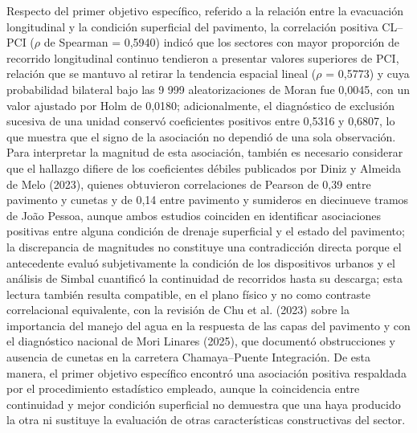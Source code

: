Respecto del primer objetivo específico, referido a la relación entre la evacuación longitudinal y la condición superficial del pavimento, la correlación positiva CL--PCI ($\rho$ de Spearman = 0,5940) indicó que los sectores con mayor proporción de recorrido longitudinal continuo tendieron a presentar valores superiores de PCI, relación que se mantuvo al retirar la tendencia espacial lineal ($\rho$ = 0,5773) y cuya probabilidad bilateral bajo las 9 999 aleatorizaciones de Moran fue 0,0045, con un valor ajustado por Holm de 0,0180; adicionalmente, el diagnóstico de exclusión sucesiva de una unidad conservó coeficientes positivos entre 0,5316 y 0,6807, lo que muestra que el signo de la asociación no dependió de una sola observación. Para interpretar la magnitud de esta asociación, también es necesario considerar que el hallazgo difiere de los coeficientes débiles publicados por Diniz y Almeida de Melo (2023), quienes obtuvieron correlaciones de Pearson de 0,39 entre pavimento y cunetas y de 0,14 entre pavimento y sumideros en diecinueve tramos de João Pessoa, aunque ambos estudios coinciden en identificar asociaciones positivas entre alguna condición de drenaje superficial y el estado del pavimento; la discrepancia de magnitudes no constituye una contradicción directa porque el antecedente evaluó subjetivamente la condición de los dispositivos urbanos y el análisis de Simbal cuantificó la continuidad de recorridos hasta su descarga; esta lectura también resulta compatible, en el plano físico y no como contraste correlacional equivalente, con la revisión de Chu et al. (2023) sobre la importancia del manejo del agua en la respuesta de las capas del pavimento y con el diagnóstico nacional de Mori Linares (2025), que documentó obstrucciones y ausencia de cunetas en la carretera Chamaya--Puente Integración. De esta manera, el primer objetivo específico encontró una asociación positiva respaldada por el procedimiento estadístico empleado, aunque la coincidencia entre continuidad y mejor condición superficial no demuestra que una haya producido la otra ni sustituye la evaluación de otras características constructivas del sector.

